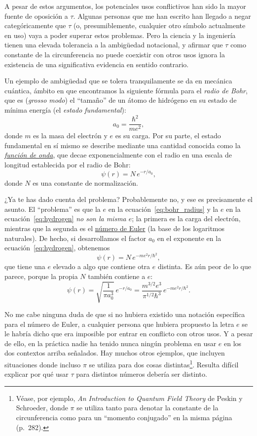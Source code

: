 A pesar de estos argumentos, los potenciales usos conflictivos han sido la mayor fuente de oposición a $\tau$. Algunas personas que me han escrito han llegado a negar categóricamente que $\tau$ (o, presumiblemente, cualquier otro símbolo actualmente en uso) vaya a poder superar estos problemas. Pero la ciencia y la ingeniería tienen una elevada tolerancia a la ambigüedad notacional, y afirmar que $\tau$ como constante de la circunferencia no puede coexistir con otros usos ignora la existencia de una significativa evidencia en sentido contrario.

Un ejemplo de  ambigüedad que se tolera tranquilamente se da en mecánica cuántica, ámbito en que encontramos la siguiente fórmula para el \emph{radio de Bohr}, que es (\textit{grosso modo}) el ``tamaño'' de un átomo de hidrógeno en su estado de mínima energía (el \emph{estado fundamental}):
\begin{equation}
  \label{eq:bohr_radius}
  a_0 = \frac{\hbar^2}{m e^2},
  \end{equation}
donde $m$ es la masa del electrón y $e$ es su carga. Por su parte, el estado fundamental en sí mismo se describe mediante una cantidad conocida como la \href{https://es.wikipedia.org/wiki/Función_de_onda}{\emph{función de onda}}, que decae exponencialmente con el radio en una escala de longitud establecida por el radio de Bohr:
\begin{equation}
\label{eq:hydrogen}
\psi(r) = N\,e^{-r/a_0},
\end{equation}
donde $N$ es una constante de normalización.

¿Ya te has dado cuenta del problema? Probablemente no, y ese es precisamente el asunto. El ``problema'' es que la $e$ en la ecuación~\eqref{eq:bohr_radius} y la $e$ en la ecuación~\eqref{eq:hydrogen} \emph{no son la misma $e$}; la primera es la carga del electrón, mientras que la segunda es el \href{https://es.wikipedia.org/wiki/N%C3%BAmero_e}{número de Euler} (la base de los logaritmos naturales). De hecho, si desarrollamos el factor $a_0$ en el exponente en la ecuación~\eqref{eq:hydrogen}, obtenemos
\[
\psi(r) = N\,e^{-m e^2 r/\hbar^2},
\]
que tiene una $e$ elevado a algo que contiene otra $e$ distinta. Es aún peor de lo que parece, porque la propia $N$ también contiene a $e$:
\[
\psi(r) = \sqrt{\frac{1}{\pi a_0^3}}\,e^{-r/a_0} =
\frac{m^{3/2} e^3}{\pi^{1/2} \hbar^3}\,e^{-m e^2 r/\hbar^2}.
\]

No me cabe ninguna duda de que si no hubiera existido una notación específica para el número de Euler, a cualquier persona que hubiera propuesto la letra $e$ se le habría dicho que era imposible por entrar en conflicto con otros usos. Y a pesar de ello, en la práctica nadie ha tenido nunca ningún problema en usar $e$ en los dos contextos arriba señalados. Hay muchos otros ejemplos, que incluyen situaciones donde incluso $\pi$ se utiliza para dos cosas distintas\footnote{Véase, por ejemplo, \emph{An Introduction to Quantum Field Theory} de Peskin y Schroeder, donde $\pi$ se utiliza tanto para denotar la constante de la circunferencia como para un ``momento conjugado'' en la misma página (p.~282).}. Resulta difícil explicar por qué usar $\tau$ para distintos números debería ser distinto.


